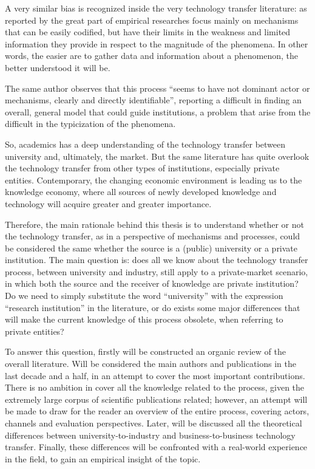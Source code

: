 A very similar bias is recognized inside the very technology transfer literature: as reported by \citet{Muscio2008} the great part of empirical researches focus mainly on mechanisms that can be easily codified, but have their limits in the weakness and limited information they provide in respect to the magnitude of the phenomena. In other words, the easier are to gather data and information about a phenomenon, the better understood it will be. 

The same author observes that this process \enquote{seems to have not dominant actor or mechanisms, clearly and directly identifiable}, reporting a difficult in finding an overall, general model that could guide institutions, a problem that arise from the difficult in the typicization of the phenomena.

So, academics has a deep understanding of the technology transfer between university and, ultimately, the market. But the same literature has quite overlook the technology transfer from other types of institutions, especially private entities. Contemporary, the changing economic environment is leading us to the knowledge economy, where all sources of newly developed knowledge and technology will acquire greater and greater importance. 

Therefore, the main rationale behind this thesis is to understand whether or not the technology transfer, as in a perspective of mechanisms and processes, could be considered the same whether the source is a (public) university or a private institution. The main question is: does all we know about the technology transfer process, between university and industry, still apply to a private-market scenario, in which both the source and the receiver of knowledge are private institution? Do we need to simply substitute the word \enquote{university} with the expression \enquote{research institution} in the literature, or do exists some major differences that will make the current knowledge of this process obsolete, when referring to private entities?

To answer this question, firstly will be constructed an organic review of the overall literature. Will be considered the main authors and publications in the last decade and a half, in an attempt to cover the most important contributions. There is no ambition in cover all the knowledge related to the process, given the extremely large corpus of scientific publications related; however, an attempt will be made to draw for the reader an overview of the entire process, covering actors, channels and evaluation perspectives. Later, will be discussed all the theoretical differences between university-to-industry and business-to-business technology transfer. Finally, these differences will be confronted with a real-world experience in the field, to gain an empirical insight of the topic.
